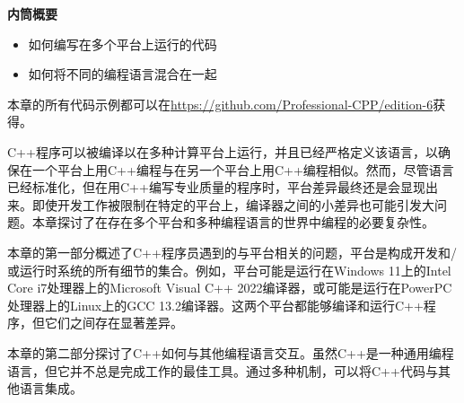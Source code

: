 \noindent
\textbf{内筒概要}

\begin{itemize}
\item
如何编写在多个平台上运行的代码

\item
如何将不同的编程语言混合在一起
\end{itemize}

本章的所有代码示例都可以在\url{https://github.com/Professional-CPP/edition-6}获得。

C++程序可以被编译以在多种计算平台上运行，并且已经严格定义该语言，以确保在一个平台上用C++编程与在另一个平台上用C++编程相似。然而，尽管语言已经标准化，但在用C++编写专业质量的程序时，平台差异最终还是会显现出来。即使开发工作被限制在特定的平台上，编译器之间的小差异也可能引发大问题。本章探讨了在存在多个平台和多种编程语言的世界中编程的必要复杂性。

本章的第一部分概述了C++程序员遇到的与平台相关的问题，平台是构成开发和/或运行时系统的所有细节的集合。例如，平台可能是运行在Windows 11上的Intel Core i7处理器上的Microsoft Visual C++ 2022编译器，或可能是运行在PowerPC处理器上的Linux上的GCC 13.2编译器。这两个平台都能够编译和运行C++程序，但它们之间存在显著差异。

本章的第二部分探讨了C++如何与其他编程语言交互。虽然C++是一种通用编程语言，但它并不总是完成工作的最佳工具。通过多种机制，可以将C++代码与其他语言集成。


